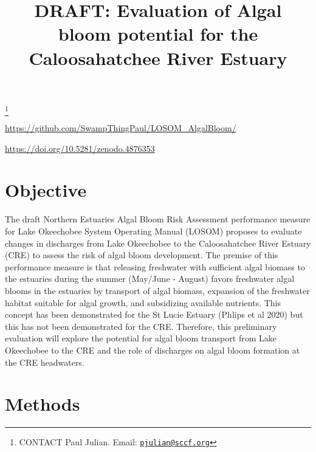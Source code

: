 \documentclass[]{interact}
\theoremstyle{plain}%
\theoremstyle{definition}
\theoremstyle{remark}
\begin{document}

\title{DRAFT: Evaluation of Algal bloom potential for the Caloosahatchee
River Estuary}


\author{
}

\thanks{CONTACT Paul
Julian. Email: \href{mailto:pjulian@sccf.org}{\nolinkurl{pjulian@sccf.org}}}

\maketitle



\begin{github}
\url{https://github.com/SwampThingPaul/LOSOM_AlgalBloom/}
\end{github}

\begin{DOI}
\url{https://doi.org/10.5281/zenodo.4876353}
\end{DOI}

\hypertarget{objective}{%
\section{Objective}\label{objective}}

The draft Northern Estuaries Algal Bloom Risk Assessment performance
measure for Lake Okeechobee System Operating Manual (LOSOM) proposes to
evaluate changes in discharges from Lake Okeechobee to the
Caloosahatchee River Estuary (CRE) to assess the risk of algal bloom
development. The premise of this performance measure is that releasing
freshwater with sufficient algal biomass to the estuaries during the
summer (May/June - August) favors freshwater algal blooms in the
estuaries by transport of algal biomass, expansion of the freshwater
habitat suitable for algal growth, and subsidizing available nutrients.
This concept has been demonstrated for the St Lucie Estuary (Phlips et
al 2020) but this has not been demonstrated for the CRE. Therefore, this
preliminary evaluation will explore the potential for algal bloom
transport from Lake Okeechobee to the CRE and the role of discharges on
algal bloom formation at the CRE headwaters.

\hypertarget{methods}{%
\section{Methods}\label{methods}}
\end{document}

